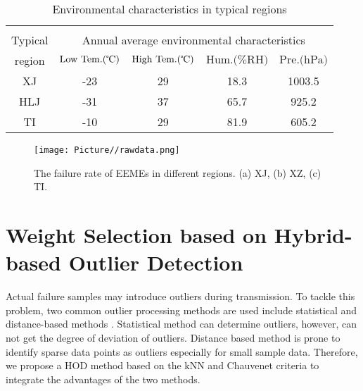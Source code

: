 \documentclass[journal,twoside,web]{ieeecolor}
\begin{document}
\begin{table}
	\caption{Environmental characteristics in typical regions}
	\label{table1}
	\setlength{\tabcolsep}{5pt}
	\renewcommand\arraystretch{1.1}
	\begin{center}
		\begin{tabular}{c c c c c}	
			\hline\hline \\[-3mm]
			\multicolumn{1}{c}{Typical} &  \multicolumn{4}{c}{Annual average environmental characteristics} \\ \cline{2-5}
			region & $ \text{Low Tem.(\textcelsius)} $ & $ \text{High Tem.(\textcelsius)} $  & $ \text{Hum.(\%RH)}$ & $ \text{Pre.(hPa)} $  \\
			\hline
			XJ   & -23      & 29       & 18.3            & 1003.5     \\
			HLJ  & -31      & 37       & 65.7             & 925.2     \\
			TI   & -10      & 29       & 81.9             & 605.2     \\
			\hline\hline 
		\end{tabular}
	\end{center}
\end{table}

\begin{figure*}
	\centering
	\texttt{[image: Picture//rawdata.png]}
	\caption{The failure rate of EEMEs in different regions. (a) XJ, (b) XZ, (c) TI.}
	\label{fig0}
\end{figure*}





\section{Weight Selection based on Hybrid-based Outlier Detection}
\label{Section3:knn}

Actual failure samples may introduce outliers during transmission. To tackle this problem, two common outlier processing methods are used include statistical and distance-based methods \cite{6684530}. Statistical method can determine outliers, however, can not get the degree of deviation of outliers. Distance based method is prone to identify sparse data points as outliers especially for small sample data. Therefore, we propose a HOD method based on the kNN and Chauvenet criteria to integrate the advantages of the two methods.
\end{document}
